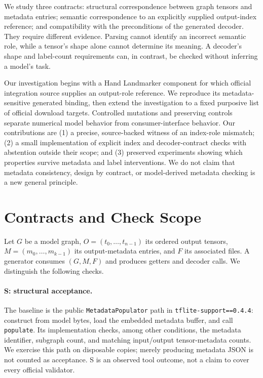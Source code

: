 \documentclass[10pt,twocolumn,letterpaper]{article}
\newcommand{\code}[1]{\texttt{#1}}
\begin{document}
We study three contracts: structural correspondence between graph tensors and metadata entries; semantic correspondence to an explicitly supplied output-index reference; and compatibility with the preconditions of the generated decoder. They require different evidence. Parsing cannot identify an incorrect semantic role, while a tensor's shape alone cannot determine its meaning. A decoder's shape and label-count requirements can, in contrast, be checked without inferring a model's task.

Our investigation begins with a Hand Landmarker component for which official integration source supplies an output-role reference. We reproduce its metadata-sensitive generated binding, then extend the investigation to a fixed purposive list of official download targets. Controlled mutations and preserving controls separate numerical model behavior from consumer-interface behavior. Our contributions are (1) a precise, source-backed witness of an index-role mismatch; (2) a small implementation of explicit index and decoder-contract checks with abstention outside their scope; and (3) preserved experiments showing which properties survive metadata and label interventions. We do not claim that metadata consistency, design by contract, or model-derived metadata checking is a new general principle.

\section{Contracts and Check Scope}
Let $G$ be a model graph, $O=(t_0,\ldots,t_{n-1})$ its ordered output tensors, $M=(m_0,\ldots,m_{k-1})$ its output-metadata entries, and $F$ its associated files. A generator consumes $(G,M,F)$ and produces getters and decoder calls. We distinguish the following checks.

\paragraph{S: structural acceptance.}
The baseline is the public \code{MetadataPopulator} path in \code{tflite-support==0.4.4}: construct from model bytes, load the embedded metadata buffer, and call \code{populate}. Its implementation checks, among other conditions, the metadata identifier, subgraph count, and matching input/output tensor-metadata counts. We exercise this path on disposable copies; merely producing metadata JSON is not counted as acceptance. S is an observed tool outcome, not a claim to cover every official validator.
\end{document}
